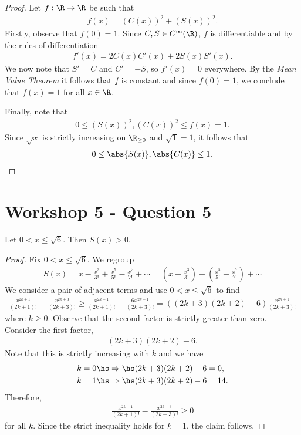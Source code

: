 \documentclass{article}
\begin{document}
\begin{proof}
	Let $f:\R\to\R$ be such that
	\begin{align*}
		f(x) = (C(x))^2 + (S(x))^2.
	\end{align*}
	Firstly, observe that $f(0)=1$.
	Since $C,S\in C^\infty(\R)$, $f$ is differentiable and by the rules of differentiation
	\begin{align*}
		f'(x) = 2C(x)C'(x) + 2S(x)S'(x).
	\end{align*}
	We now note that $S'=C$ and $C'=-S$, so $f'(x)=0$ everywhere. By the \emph{Mean Value Theorem}
	it follows that $f$ is constant and since $f(0)=1$, we conclude that $f(x)=1$ for all $x\in\R$.

	Finally, note that
	\begin{align*}
		0 \leq (S(x))^2, (C(x))^2 \leq f(x) = 1.
	\end{align*}
	Since $\sqrt{x}$ is strictly increasing on $\R_{\geq 0}$ and $\sqrt{1}=1$, it follows that
	\begin{align*}
		0 \leq \abs{S(x)}, \abs{C(x)} \leq 1.
	\end{align*}
\end{proof}

\section*{Workshop 5 - Question 5}

\begin{claim*}
	Let $0<x\leq \sqrt{6}$. Then $S(x)>0$.
\end{claim*}
\begin{proof}
	Fix $0<x\leq\sqrt{6}$. We regroup
	\begin{align*}
		S(x) = x - \frac{x^3}{3!} + \frac{x^5}{5!} - \frac{x^7}{7!} + \cdots
		= \left(x - \frac{x^3}{3!}\right) + \left(\frac{x^5}{5!} - \frac{x^7}{7!}\right) + \cdots
	\end{align*}
	We consider a pair of adjacent terms and use $0<x\leq\sqrt{6}$ to find
	\begin{align*}
		\frac{x^{2k+1}}{(2k+1)!} - \frac{x^{2k+3}}{(2k+3)!}
		\geq \frac{x^{2k+1}}{(2k+1)!}-\frac{6x^{2k+1}}{(2k+3)!}
		= ((2k+3)(2k+2)-6)\frac{x^{2k+1}}{(2k+3)!}
	\end{align*}
	where $k\geq 0$.
	Observe that the second factor is strictly greater than zero. Consider the first factor,
	\begin{align*}
		(2k+3)(2k+2) - 6.
	\end{align*}
	Note that this is strictly increasing with $k$ and we have
	\begin{align*}
		k=0 \hs & \Rightarrow\hs (2k+3)(2k+2) - 6 = 0,  \\
		k=1 \hs & \Rightarrow\hs (2k+3)(2k+2) - 6 = 14. \\
	\end{align*}
	Therefore,
	\begin{align*}
		\frac{x^{2k+1}}{(2k+1)!} - \frac{x^{2k+3}}{(2k+3)!} \geq 0
	\end{align*}
	for all $k$. Since the strict inequality holds for $k=1$, the claim follows.
\end{proof}
\end{document}
